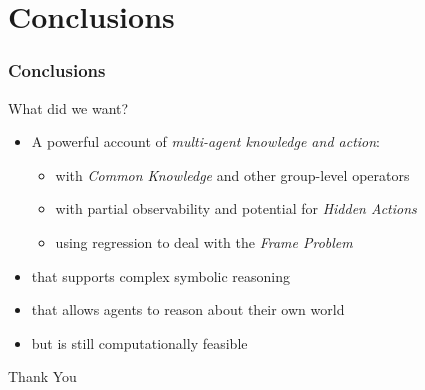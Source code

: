 \documentclass{beamer}
\begin{document}
\section{Conclusions}

\begin{frame}
\frametitle{Conclusions}
What did we want?
\begin{itemize}
\item A powerful account of \emph{multi-agent knowledge and action}:
  \begin{itemize}
    \item with \emph{Common Knowledge} and other group-level operators
    \item with partial observability and potential for \emph{Hidden Actions}
    \item using regression to deal with the \emph{Frame Problem}
  \end{itemize}
\item that supports complex symbolic reasoning
\item that allows agents to reason about their own world
\item but is still computationally feasible
\end{itemize}
\end{frame}

\begin{frame}
\centering \large Thank You\\
\end{frame}
\end{document}
